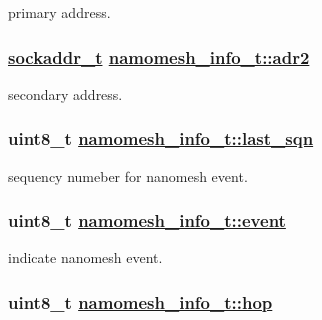 primary address. \hypertarget{structnamomesh__info__t_628dc59b37e2188905a49208b5678924}{
\subsubsection[adr2]{\setlength{\rightskip}{0pt plus 5cm}\hyperlink{structsockaddr__t}{sockaddr\_\-t} \hyperlink{structnamomesh__info__t_628dc59b37e2188905a49208b5678924}{namomesh\_\-info\_\-t::adr2}}}
\label{structnamomesh__info__t_628dc59b37e2188905a49208b5678924}


secondary address. \hypertarget{structnamomesh__info__t_01660e69d510cbfaf227a561710be004}{
\subsubsection[last\_\-sqn]{\setlength{\rightskip}{0pt plus 5cm}uint8\_\-t \hyperlink{structnamomesh__info__t_01660e69d510cbfaf227a561710be004}{namomesh\_\-info\_\-t::last\_\-sqn}}}
\label{structnamomesh__info__t_01660e69d510cbfaf227a561710be004}


sequency numeber for nanomesh event. \hypertarget{structnamomesh__info__t_0c48ca38620172086d488437fe8c3c0e}{
\subsubsection[event]{\setlength{\rightskip}{0pt plus 5cm}uint8\_\-t \hyperlink{structnamomesh__info__t_0c48ca38620172086d488437fe8c3c0e}{namomesh\_\-info\_\-t::event}}}
\label{structnamomesh__info__t_0c48ca38620172086d488437fe8c3c0e}


indicate nanomesh event. \hypertarget{structnamomesh__info__t_0ada1dc9dbe42d9c5a781c35dc1dd4d7}{
\subsubsection[hop]{\setlength{\rightskip}{0pt plus 5cm}uint8\_\-t \hyperlink{structnamomesh__info__t_0ada1dc9dbe42d9c5a781c35dc1dd4d7}{namomesh\_\-info\_\-t::hop}}}
\label{structnamomesh__info__t_0ada1dc9dbe42d9c5a781c35dc1dd4d7}


